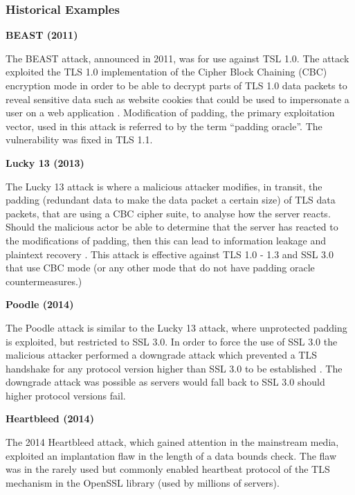 \documentclass{mscreport}
\begin{document}
\subsubsection{Historical Examples}
\textbf{BEAST (2011)}

\vspace{0.2cm} \noindent
The BEAST attack, announced in 2011, was for use against TSL 1.0. The attack exploited the TLS 1.0 implementation of the Cipher Block Chaining (CBC) encryption mode in order to be able to decrypt parts of TLS 1.0 data packets to reveal sensitive data such as website cookies that could be used to impersonate a user on a web application \cite{Ristic2017-aj,Levillain2015-os}. Modification of padding, the primary exploitation vector, used in this attack is referred to by the term ``padding oracle''. The vulnerability was fixed in TLS 1.1.


\vspace{0.6cm} \noindent
\textbf{Lucky 13 (2013)}


\vspace{0.2cm} \noindent
The Lucky 13 attack is where a malicious attacker modifies, in transit, the padding (redundant data to make the data packet a certain size) of TLS data packets, that are using a CBC cipher suite, to analyse how the server reacts. Should the malicious actor be able to determine that the server has reacted to the modifications of padding, then this can lead to information leakage and plaintext recovery \cite{Ristic2017-aj,Al_Fardan2013-sw}. This attack is effective against TLS 1.0 - 1.3 and SSL 3.0 that use CBC mode (or any other mode that do not have padding oracle countermeasures.)


\vspace{0.6cm} \noindent
\textbf{Poodle (2014)}

\vspace{0.2cm} \noindent
The Poodle attack is similar to the Lucky 13 attack, where unprotected padding is exploited, but restricted to SSL 3.0. In order to force the use of SSL 3.0 the malicious attacker performed a downgrade attack which prevented a TLS handshake for any protocol version higher than SSL 3.0 to be established \cite{Ristic2017-aj,Al_Fardan2013-sw}. The downgrade attack was possible as servers would fall back to SSL 3.0 should higher protocol versions fail.


\vspace{0.6cm} \noindent
\textbf{Heartbleed (2014)}

\vspace{0.2cm} \noindent
The 2014 Heartbleed attack, which gained attention in the mainstream media, exploited an implantation flaw in the length of a data bounds check. The flaw was in the rarely used but commonly enabled heartbeat protocol \cite{Durumeric2014-yj} of the TLS mechanism in the OpenSSL library (used by millions of servers).
\end{document}
